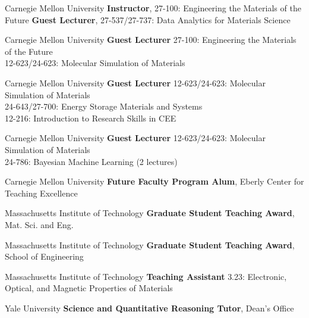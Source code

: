     {Carnegie Mellon University}
    {\textbf{Instructor}, 27-100: Engineering the Materials of the Future}{}
    {\textbf{Guest Lecturer}, 27-537/27-737: Data Analytics for Materials Science}

\vspace{-3mm}
    {Carnegie Mellon University}
    {\textbf{Guest Lecturer}}
    {27-100: Engineering the Materials of the Future\\
    12-623/24-623: Molecular Simulation of Materials}

\vspace{-3mm}
    {Carnegie Mellon University}
    {\textbf{Guest Lecturer}}
    {12-623/24-623: Molecular Simulation of Materials\\
    24-643/27-700: Energy Storage Materials and Systems\\
    12-216: Introduction to Research Skills in CEE}

\vspace{-3mm}
    {Carnegie Mellon University}
    {\textbf{Guest Lecturer}}
    {12-623/24-623: Molecular Simulation of Materials\\
    24-786: Bayesian Machine Learning (2 lectures)}

\vspace{2.2mm}
\datedsubsectionnarrow{}
    {Carnegie Mellon University}
    {\textbf{Future Faculty Program Alum}, Eberly Center for Teaching Excellence}{}

\vspace{2.2mm}
    {Massachusetts Institute of Technology}
    {\textbf{Graduate Student Teaching Award}, Mat. Sci. and Eng.}{}

\datedsubsectionnarrow{}
    {Massachusetts Institute of Technology}
    {\textbf{Graduate Student Teaching Award}, School of Engineering}{}

\vspace{-3mm}
    {Massachusetts Institute of Technology}
    {\textbf{Teaching Assistant}}
    {3.23: Electronic, Optical, and Magnetic Properties of Materials}

\vspace{2.2mm}
    {Yale University}
    {\textbf{Science and Quantitative Reasoning Tutor}, Dean's Office}{}
